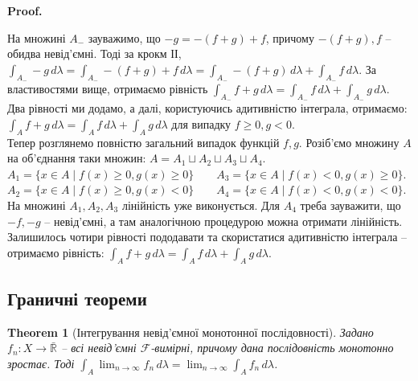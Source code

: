 \documentclass[a4paper, 10pt]{article}
\makeatletter
\theoremstyle{theoremdd}
\newtheorem{theorem}{Theorem}[subsection]
\renewenvironment{proof}[1][Proof.\\]{\par
\pushQED{\hfill \qed}%
\normalfont \topsep6\p@\@plus6\p@\relax
\trivlist
\item\relax
{\bfseries
#1\@addpunct{.}}\hspace\labelsep\ignorespaces
}{%
\popQED\endtrivlist\@endpefalse
}
\makeatother
\begin{document}
\begin{proof}
На множині $A_-$ зауважимо, що $-g = -(f+g)+f$, причому $-(f+g),f$ -- обидва невід'ємні. Тоді за крокм ІІ, $\displaystyle\int_{A_-} -g\,d\lambda = \int_{A_-} -(f+g)+f\,d\lambda = \int_{A_-} -(f+g)\,d\lambda + \int_{A_-} f\,d\lambda$. За властивостями вище, отримаємо рівність $\displaystyle\int_{A_-}f+g\,d\lambda = \int_{A_-}f\,d\lambda + \int_{A_-}g\,d\lambda$.\\
Два рівності ми додамо, а далі, користуючись адитивністю інтеграла, отримаємо: \\
$\displaystyle\int_A f+g\,d\lambda = \int_A f\,d\lambda + \int_A g\,d\lambda$ для випадку $f \geq 0, g < 0$.\\
Тепер розглянемо повністю загальний випадок функцій $f,g$. Розіб'ємо множину $A$ на об'єднання таки множин: $A = A_1 \sqcup A_2 \sqcup A_3 \sqcup A_4$.\\
$A_1 = \{x \in A \mid f(x) \geq 0, g(x) \geq 0\} \qquad A_3 = \{x \in A \mid f(x) < 0, g(x) \geq 0\}$.\\
$A_2 = \{x \in A \mid f(x) \geq 0, g(x) < 0\} \qquad A_4 = \{x \in A \mid f(x) < 0, g(x) < 0\}$.\\
На множині $A_1, A_2, A_3$ лінійність уже виконується. Для $A_4$ треба зауважити, що $-f,-g$ -- невід'ємні, а там аналогічною процедурою можна отримати лінійність. Залишилось чотири рівності пододавати та скористатися адитивністю інтеграла -- отримаємо рівність:
$\displaystyle\int_A f+g\,d\lambda = \int_A f\,d\lambda + \int_A g\,d\lambda$.
\end{proof}

\subsection{Граничні теореми}
\begin{theorem}[Інтегрування невід'ємної монотонної послідовності]
\label{integrate_monotonic_nonnegative_sequence}
Задано $f_n \colon X \to \bar{\mathbb{R}}$ -- всі невід'ємні $\mathcal{F}$-вимірні, причому дана послідовність монотонно зростає. Тоді $\displaystyle\int_A \lim_{n \to \infty} f_n\,d\lambda = \lim_{n \to \infty} \int_A f_n\,d\lambda$.
\end{theorem}
\end{document}
